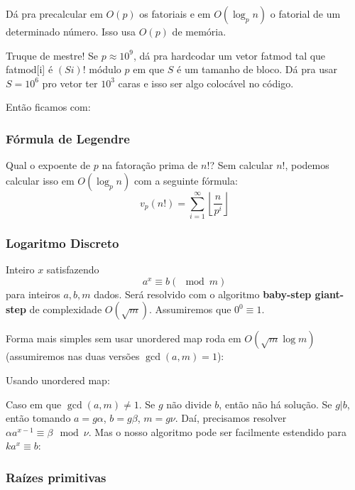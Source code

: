 Dá pra precalcular em $O(p)$ os fatoriais e em $O(\log_p n)$ o fatorial de um determinado número. Isso usa $O(p)$ de memória.


Truque de mestre! Se $p \approx 10^9$, dá pra hardcodar um vetor fatmod tal que fatmod[i] é $(Si)!$ módulo $p$ em que $S$ é um tamanho de bloco. Dá pra usar $S=10^6$ pro vetor ter $10^3$ caras e isso ser algo colocável no código.

Então ficamos com:


\subsubsection{Fórmula de Legendre}

Qual o expoente de $p$ na fatoração prima de $n!$? Sem calcular $n!$, podemos calcular isso em $O( \log_p n)$ com a seguinte fórmula:
$$ v_p(n!) = \sum\limits_{i=1}^\infty \left\lfloor \dfrac{n}{p^i} \right\rfloor$$


\subsubsection{Logaritmo Discreto}

Inteiro $x$ satisfazendo 
$$a^x \equiv b ( \mod m)$$
para inteiros $a, b, m$ dados. Será resolvido com o algoritmo \textbf{baby-step giant-step} de complexidade $O(\sqrt{m})$. Assumiremos que $0^0 \equiv 1$.

Forma mais simples sem usar unordered map roda em $O(\sqrt{m} \log m)$ (assumiremos nas duas versões $\gcd(a, m)=1$):


Usando unordered map:


Caso em que $\gcd(a, m) \neq 1$. Se $g$ não divide $b$, então não há solução. Se $g | b$, então tomando $a = g \alpha$, $b = g \beta$, $m = g \nu$. Daí, precisamos resolver $\alpha a^{x-1} \equiv \beta \mod \nu$. Mas o nosso algoritmo pode ser facilmente estendido para $k a^x \equiv b$:


\subsubsection{Raízes primitivas}

